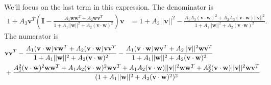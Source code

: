 \documentclass[11pt]{article}
\begin{document}
We'll focus on the last term in this expression. The denominator is 
\begin{align}
1 + A_3 \mathbf{v}^T \left(\mathbf{I} - \frac{A_1 \mathbf{ww}^T + A_2 \mathbf{wv}^T}{1 + A_1 ||\mathbf{w}||^2 + A_2 (\mathbf{v}\cdot\mathbf{w})^2}\right)\mathbf{v} &= 1 + A_3 ||\mathbf{v}||^2 - \frac{A_1A_3(\mathbf{v} \cdot \mathbf{w})^2 + A_2A_3(\mathbf{v}\cdot\mathbf{w})||\mathbf{v}||^2}{1 + A_1 ||\mathbf{w}||^2 + A_2 (\mathbf{v}\cdot \mathbf{w})^2}.
\end{align}
The numerator is 
\begin{align}
	&\mathbf{vv}^T - \frac{A_1 (\mathbf{v}\cdot\mathbf{w}) \mathbf{vw}^T + A_2 (\mathbf{v}\cdot \mathbf{w}) \mathbf{vv}^T}{1 + A_1 ||\mathbf{w}||^2 + A_2 (\mathbf{v}\cdot\mathbf{w})^2} - \frac{A_1(\mathbf{v}\cdot\mathbf{w}) \mathbf{wv}^T + A_2 ||\mathbf{v}||^2 \mathbf{wv}^T}{1 + A_1 ||\mathbf{w}||^2 + A_2 (\mathbf{v}\cdot\mathbf{w})^2} \notag \\
	&+ \frac{A_1^2 (\mathbf{v}\cdot\mathbf{w})^2\mathbf{ww}^T+ A_1 A_2 (\mathbf{v}\cdot\mathbf{w})^2 \mathbf{wv}^T + A_1 A_2(\mathbf{v}\cdot\mathbf{w}) ||\mathbf{v}||^2\mathbf{ww}^T + A_2^2(\mathbf{v}\cdot\mathbf{w})||\mathbf{v}||^2 \mathbf{wv}^T}{(1 + A_1 ||\mathbf{w}||^2 + A_2 (\mathbf{v}\cdot\mathbf{w})^2)^2}
\end{align}
\end{document}
